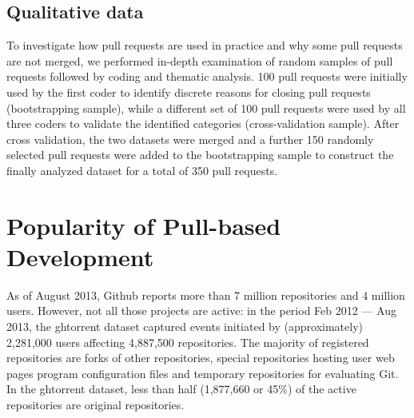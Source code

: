 \documentclass{sig-alternate}
\begin{document}
\vspace{1em}
\subsection{Qualitative data}
\label{sec:qualdata}
To investigate how pull requests are used in practice and why some pull requests
are not merged, we performed in-depth examination of random samples of pull
requests followed by coding and thematic analysis. 100 pull requests were initially
used by the first coder to identify discrete reasons for closing pull requests
(bootstrapping sample), while a different set of 100 pull requests were used by
all three coders to validate the identified categories (cross-validation
sample). After cross validation, the two datasets were merged and a further 150 randomly selected pull requests
were added to the bootstrapping sample to construct the finally analyzed
dataset for a total of 350 pull requests.


\section{Popularity of Pull-based Development}
\label{sec:github}
%


As of August 2013, Github reports
more than 7 million repositories and 4 million users. However, not all those
projects are active: in the period Feb 2012 --- Aug 2013, the {\sc ght}orrent dataset captured events initiated by
(approximately) 2,281,000 users affecting 4,887,500 repositories. The majority
of registered repositories are forks of other repositories, special repositories
hosting user web pages 
program
configuration files 
and temporary repositories for evaluating Git. 
In the {\sc ght}orrent dataset, less than half
(1,877,660 or 45\%) of the active repositories are original repositories.
\end{document}
